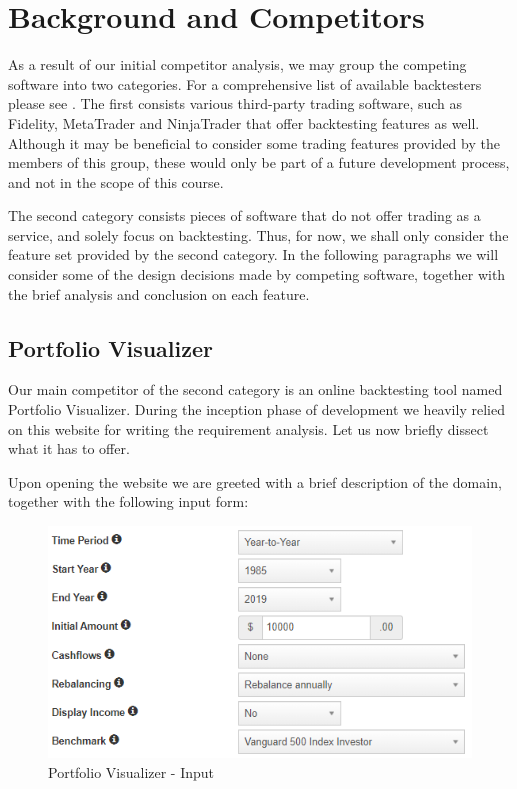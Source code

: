 \documentclass[main.tex]{subfiles}
\begin{document}
\section{Background and Competitors}
As a result of our initial competitor analysis, we may group the competing software into two categories. For a comprehensive list of available backtesters please see \cite{listofbacktesters}. The first consists various third-party trading software, such as Fidelity, MetaTrader and NinjaTrader that offer backtesting features as well. Although it may be beneficial to consider some trading features provided by the members of this group, these would only be part of a future development process, and not in the scope of this course.

The second category consists pieces of software that do not offer trading as a service, and solely focus on backtesting. Thus, for now, we shall only consider the feature set provided by the second category. In the following paragraphs we will consider some of the design decisions made by competing software, together with the brief analysis and conclusion on each feature.

\subsection{Portfolio Visualizer}
Our main competitor of the second category is an online backtesting tool named Portfolio Visualizer\cite{portfoliovis}. During the inception phase of development we heavily relied on this website for writing the requirement analysis. Let us now briefly dissect what it has to offer. 

Upon opening the website we are greeted with a brief description of the domain, together with the following input form:

\begin{figure}[H]
   \centering
   \includegraphics[scale=0.8]{02Background/02Pictures/portfolio_visualizer_input_1.png}
   \caption{Portfolio Visualizer - Input}
\end{figure}
\end{document}
